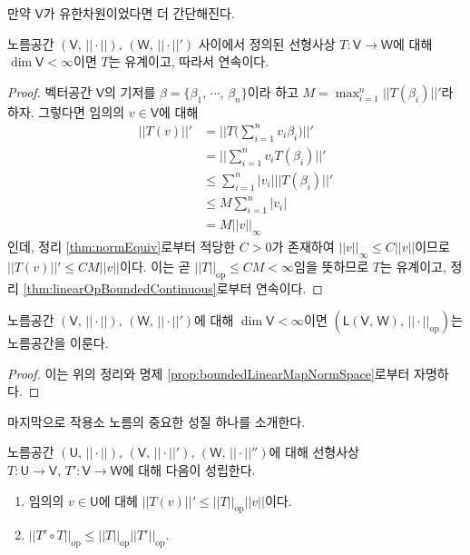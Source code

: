 만약 $\mathsf{V}$가 유한차원이었다면 더 간단해진다.

\begin{theorem}
    노름공간 $(\mathsf{V},\,||\cdot||),\,(\mathsf{W},\,||\cdot||')$ 사이에서 정의된 선형사상 $T:\mathsf{V}\to\mathsf{W}$에 대해 $\dim\mathsf{V}<\infty$이면 $T$는 유계이고, 따라서 연속이다.
\end{theorem}

\begin{proof}
    벡터공간 $\mathsf{V}$의 기저를 $\beta=\{\beta_1,\,\cdots,\,\beta_n\}$이라 하고 $M=\max_{i=1}^n||T(\beta_i)||'$라 하자. 그렇다면 임의의 $v\in\mathsf{V}$에 대해
    \begin{align*}
        ||T(v)||'&=\bigg|\bigg|T\bigg(\sum_{i=1}^nv_i\beta_i\bigg)\bigg|\bigg|'\\
        &=\bigg|\bigg|\sum_{i=1}^nv_iT(\beta_i)\bigg|\bigg|'\\
        &\leq\sum_{i=1}^n|v_i|||T(\beta_i)||'\\
        &\leq M\sum_{i=1}^n|v_i|\\
        &=M||v||_\infty
    \end{align*}
    인데, 정리 \ref{thm:normEquiv}로부터 적당한 $C>0$가 존재하여 $||v||_\infty\leq C||v||$이므로 $||T(v)||'\leq CM||v||$이다. 이는 곧 $||T||_\mathrm{op}\leq CM<\infty$임을 뜻하므로 $T$는 유계이고, 정리 \ref{thm:linearOpBoundedContinuous}로부터 연속이다.
\end{proof}

\begin{corollary}
    노름공간 $(\mathsf{V},\,||\cdot||),\,(\mathsf{W},\,||\cdot||')$에 대해 $\dim\mathsf{V}<\infty$이면 $(\mathsf{L}(\mathsf{V},\,\mathsf{W}),\,||\cdot||_\mathrm{op})$는 노름공간을 이룬다.
\end{corollary}

\begin{proof}
    이는 위의 정리와 명제 \ref{prop:boundedLinearMapNormSpace}로부터 자명하다.
\end{proof}

마지막으로 작용소 노름의 중요한 성질 하나를 소개한다.

\begin{theorem}\label{thm:opNormProp}
    노름공간 $(\mathsf{U},\,||\cdot||),\,(\mathsf{V},\,||\cdot||'),\,(\mathsf{W},\,||\cdot||'')$에 대해 선형사상 $T:\mathsf{U}\to\mathsf{V},\,T':\mathsf{V}\to\mathsf{W}$에 대해 다음이 성립한다.
    \begin{enumerate}
        \item 임의의 $v\in\mathsf{U}$에 대헤 $||T(v)||'\leq||T||_\mathrm{op}||v||$이다.
        \item $||T'\circ T||_\mathrm{op}\leq||T||_\mathrm{op}||T'||_\mathrm{op}$.
    \end{enumerate}
\end{theorem}

